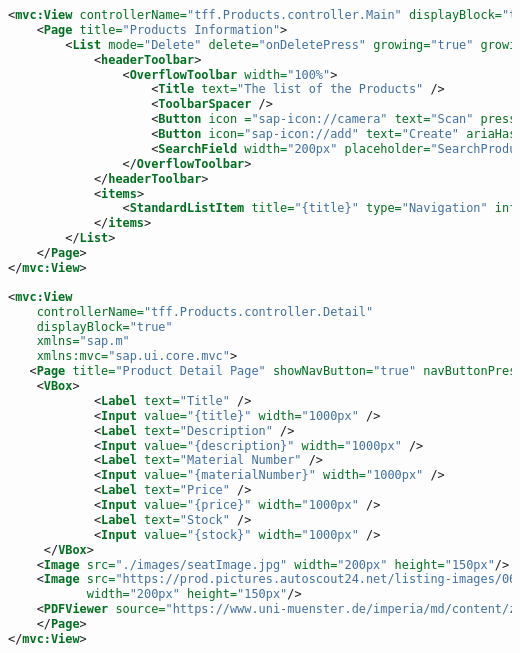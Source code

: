 \begin{mdframed}[backgroundcolor=mygrey2, leftmargin=0.5cm, hidealllines=true, innerleftmargin=3pt, innerrightmargin=0cm, innertopmargin=0cm, innerbottommargin=-3cm, splitbottomskip=0]
\begin{lstlisting}[language=XML,  caption={Main View der Anwendung in XML Format}]
<mvc:View controllerName="tff.Products.controller.Main" displayBlock="true" xmlns="sap.m" xmlns:mvc="sap.ui.core.mvc">
	<Page title="Products Information">
		<List mode="Delete" delete="onDeletePress" growing="true" growingThreshold="8" items="{path:'/Products'}" id="productsList">
			<headerToolbar>
				<OverflowToolbar width="100%">
					<Title text="The list of the Products" />
					<ToolbarSpacer />
					<Button icon ="sap-icon://camera" text="Scan" press="onScanNavi"/>
					<Button icon="sap-icon://add" text="Create" ariaHasPopup="Dialog" press="pressAddInList" />
					<SearchField width="200px" placeholder="SearchProduct" search="mySearchProduct" />
				</OverflowToolbar>
			</headerToolbar>
			<items>
				<StandardListItem title="{title}" type="Navigation" info="{price}" press="onItemPress"/>
			</items>
		</List>
	</Page>
</mvc:View>
\end{lstlisting}
\end{mdframed}

\begin{mdframed}[backgroundcolor=mygrey2, leftmargin=0.5cm, hidealllines=true, innerleftmargin=3pt, innerrightmargin=0cm, innertopmargin=0cm, innerbottommargin=-3cm, splitbottomskip=0]
\begin{lstlisting}[language=XML,  caption={Detail View der Anwendung in XML Format}]
<mvc:View
	controllerName="tff.Products.controller.Detail"
	displayBlock="true"
	xmlns="sap.m"
	xmlns:mvc="sap.ui.core.mvc">
   <Page title="Product Detail Page" showNavButton="true" navButtonPress="onNaviBack">
    <VBox>  
            <Label text="Title" />
            <Input value="{title}" width="1000px" />
            <Label text="Description" />
            <Input value="{description}" width="1000px" />
            <Label text="Material Number" />
            <Input value="{materialNumber}" width="1000px" />
            <Label text="Price" />
            <Input value="{price}" width="1000px" />
            <Label text="Stock" />
            <Input value="{stock}" width="1000px" />  
     </VBox>   
    <Image src="./images/seatImage.jpg" width="200px" height="150px"/>
    <Image src="https://prod.pictures.autoscout24.net/listing-images/0693be87-aaad-4dc8-99c5-a69b3bd48b81_1934e390-16f2-4e47-b248-02e9cc9b746b.jpg"
           width="200px" height="150px"/>
    <PDFViewer source="https://www.uni-muenster.de/imperia/md/content/zns/dokumente/beispielexpos___kowi_empirisch.pdf"/>
    </Page>
</mvc:View>
\end{lstlisting}
\end{mdframed}

